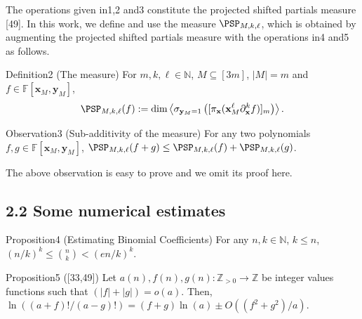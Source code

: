 The operations given in1,2 and3 constitute the projected shifted partials measure [49]. In this work, we define and use the measure $\PSP_{M,k,\ell}$, which is obtained by augmenting the projected shifted partials measure with the operations in4 and5 as follows.
\begin{authorclaim}{Definition2 (The measure)}
For $m,k,\ell\in\mathbb N$, $M\subseteq[3m]$, $|M|=m$ and $f\in\mathbb F[\mathbf x_M,\mathbf y_M]$,
\[
\PSP_{M,k,\ell}(f):=\dim\left\langle\sigma_{\mathbf y_M=1}\left([\pi_{\mathbf x}(\mathbf x_M^\ell\partial_{\mathbf x}^kf)]_m\right)\right\rangle.
\]
\end{authorclaim}
\begin{authorclaim}{Observation3 (Sub-additivity of the measure)}
For any two polynomials $f,g\in\mathbb F[\mathbf x_M,\mathbf y_M]$, $\PSP_{M,k,\ell}(f+g)\le\PSP_{M,k,\ell}(f)+\PSP_{M,k,\ell}(g)$.
\end{authorclaim}
The above observation is easy to prove and we omit its proof here.
\subsection*{2.2 Some numerical estimates}
\begin{authorclaim}{Proposition4 (Estimating Binomial Coefficients)}
For any $n,k\in\mathbb N$, $k\le n$, $(n/k)^k\le\binom nk<(en/k)^k$.
\end{authorclaim}
\begin{authorclaim}{Proposition5 ([33,49])}
Let $a(n),f(n),g(n):\mathbb Z_{>0}\to\mathbb Z$ be integer values functions such that $(|f|+|g|)=o(a)$. Then, $\ln((a+f)!/(a-g)!)=(f+g)\ln(a)\pm O((f^2+g^2)/a)$.
\end{authorclaim}

